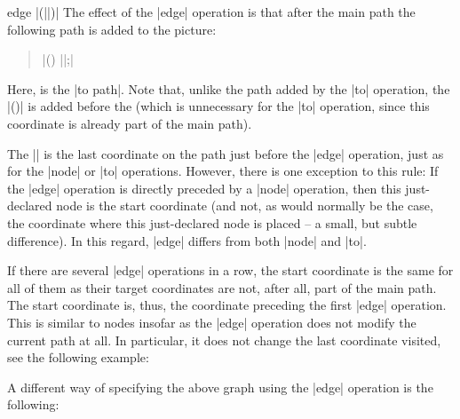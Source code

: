 \begin{pathoperation}{edge}{  |(||)|}
    The effect of the |edge| operation is that after the main path the
    following path is added to the picture:
    \begin{quote}
        | (\tikztostart) ||;|
    \end{quote}
    Here,  is the |to path|. Note that, unlike the path added by the
    |to| operation, the |(\tikztostart)| is added before the  (which
    is unnecessary for the |to| operation, since this coordinate is already
    part of the main path).

    The |\tikztostart| is the last coordinate on the path just before the
    |edge| operation, just as for the |node| or |to| operations. However, there
    is one exception to this rule: If the |edge| operation is directly preceded
    by a |node| operation, then this just-declared node is the start coordinate
    (and not, as would normally be the case, the coordinate where this
    just-declared node is placed -- a small, but subtle difference). In this
    regard, |edge| differs from both |node| and |to|.

    If there are several |edge| operations in a row, the start coordinate is
    the same for all of them as their target coordinates are not, after all,
    part of the main path. The start coordinate is, thus, the coordinate
    preceding the first |edge| operation. This is similar to nodes insofar as
    the |edge| operation does not modify the current path at all. In
    particular, it does not change the last coordinate visited, see the
    following example:
\begin{codeexample}[]
\end{codeexample}

    A different way of specifying the above graph using the |edge| operation is
    the following:
\begin{codeexample}[]
\end{codeexample}
\end{pathoperation}
